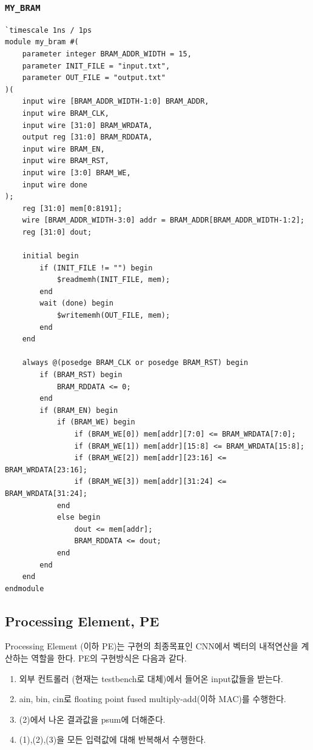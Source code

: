 \documentclass{article}
\begin{document}
\subsubsection*{\texttt{MY\_BRAM}}
\begin{lstlisting}[style={verilog-style}]
`timescale 1ns / 1ps
module my_bram #(
    parameter integer BRAM_ADDR_WIDTH = 15,
    parameter INIT_FILE = "input.txt",
    parameter OUT_FILE = "output.txt"
)(
    input wire [BRAM_ADDR_WIDTH-1:0] BRAM_ADDR,
    input wire BRAM_CLK,
    input wire [31:0] BRAM_WRDATA,
    output reg [31:0] BRAM_RDDATA,
    input wire BRAM_EN,
    input wire BRAM_RST,
    input wire [3:0] BRAM_WE,
    input wire done
);
    reg [31:0] mem[0:8191];
    wire [BRAM_ADDR_WIDTH-3:0] addr = BRAM_ADDR[BRAM_ADDR_WIDTH-1:2];
    reg [31:0] dout;
    
    initial begin
        if (INIT_FILE != "") begin
            $readmemh(INIT_FILE, mem);
        end
        wait (done) begin
            $writememh(OUT_FILE, mem);
        end
    end
    
    always @(posedge BRAM_CLK or posedge BRAM_RST) begin
        if (BRAM_RST) begin 
            BRAM_RDDATA <= 0;
        end
        if (BRAM_EN) begin
            if (BRAM_WE) begin
                if (BRAM_WE[0]) mem[addr][7:0] <= BRAM_WRDATA[7:0];
                if (BRAM_WE[1]) mem[addr][15:8] <= BRAM_WRDATA[15:8];
                if (BRAM_WE[2]) mem[addr][23:16] <= BRAM_WRDATA[23:16];
                if (BRAM_WE[3]) mem[addr][31:24] <= BRAM_WRDATA[31:24]; 
            end
            else begin
                dout <= mem[addr];
                BRAM_RDDATA <= dout;
            end
        end
    end
endmodule
\end{lstlisting}

\quad
\subsection{Processing Element, PE}

Processing Element (이하 PE)는 구현의 최종목표인 CNN에서 벡터의 내적연산을 계산하는 역할을 한다. PE의 구현방식은 다음과 같다.
\begin{enumerate}
    \item 외부 컨트롤러 (현재는 testbench로 대체)에서 들어온 input값들을 받는다.
    \item ain, bin, cin로 floating point fused multiply-add(이하 MAC)를 수행한다.
    \item (2)에서 나온 결과값을 psum에 더해준다.
    \item (1),(2),(3)을 모든 입력값에 대해 반복해서 수행한다.
\end{enumerate}
\end{document}
